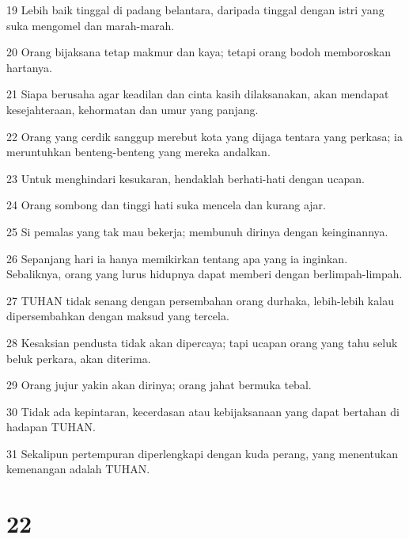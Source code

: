 \par 19 Lebih baik tinggal di padang belantara, daripada tinggal dengan istri yang suka mengomel dan marah-marah.
\par 20 Orang bijaksana tetap makmur dan kaya; tetapi orang bodoh memboroskan hartanya.
\par 21 Siapa berusaha agar keadilan dan cinta kasih dilaksanakan, akan mendapat kesejahteraan, kehormatan dan umur yang panjang.
\par 22 Orang yang cerdik sanggup merebut kota yang dijaga tentara yang perkasa; ia meruntuhkan benteng-benteng yang mereka andalkan.
\par 23 Untuk menghindari kesukaran, hendaklah berhati-hati dengan ucapan.
\par 24 Orang sombong dan tinggi hati suka mencela dan kurang ajar.
\par 25 Si pemalas yang tak mau bekerja; membunuh dirinya dengan keinginannya.
\par 26 Sepanjang hari ia hanya memikirkan tentang apa yang ia inginkan. Sebaliknya, orang yang lurus hidupnya dapat memberi dengan berlimpah-limpah.
\par 27 TUHAN tidak senang dengan persembahan orang durhaka, lebih-lebih kalau dipersembahkan dengan maksud yang tercela.
\par 28 Kesaksian pendusta tidak akan dipercaya; tapi ucapan orang yang tahu seluk beluk perkara, akan diterima.
\par 29 Orang jujur yakin akan dirinya; orang jahat bermuka tebal.
\par 30 Tidak ada kepintaran, kecerdasan atau kebijaksanaan yang dapat bertahan di hadapan TUHAN.
\par 31 Sekalipun pertempuran diperlengkapi dengan kuda perang, yang menentukan kemenangan adalah TUHAN.

\chapter{22}

